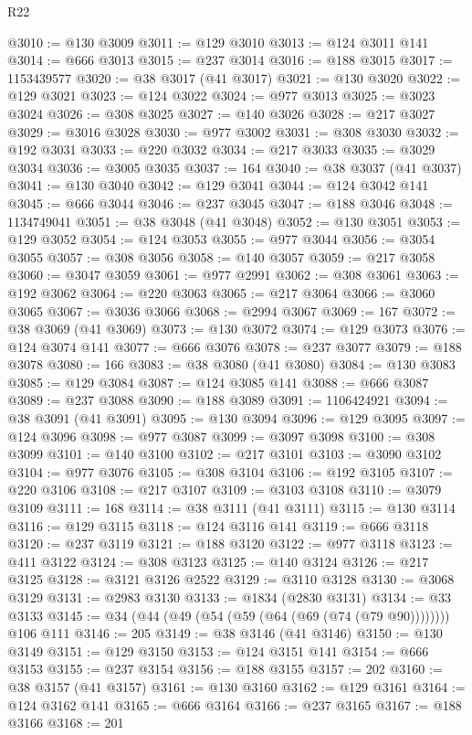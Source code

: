 \begin{lexlean}{R22}
\begin{coremodule}
@3010 := @130 @3009
@3011 := @129 @3010
@3013 := @124 @3011 @141
@3014 := @666 @3013
@3015 := @237 @3014
@3016 := @188 @3015
@3017 := 1153439577
@3020 := @38 @3017 (@41 @3017)
@3021 := @130 @3020
@3022 := @129 @3021
@3023 := @124 @3022
@3024 := @977 @3013
@3025 := @3023 @3024
@3026 := @308 @3025
@3027 := @140 @3026
@3028 := @217 @3027
@3029 := @3016 @3028
@3030 := @977 @3002
@3031 := @308 @3030
@3032 := @192 @3031
@3033 := @220 @3032
@3034 := @217 @3033
@3035 := @3029 @3034
@3036 := @3005 @3035
@3037 := 164
@3040 := @38 @3037 (@41 @3037)
@3041 := @130 @3040
@3042 := @129 @3041
@3044 := @124 @3042 @141
@3045 := @666 @3044
@3046 := @237 @3045
@3047 := @188 @3046
@3048 := 1134749041
@3051 := @38 @3048 (@41 @3048)
@3052 := @130 @3051
@3053 := @129 @3052
@3054 := @124 @3053
@3055 := @977 @3044
@3056 := @3054 @3055
@3057 := @308 @3056
@3058 := @140 @3057
@3059 := @217 @3058
@3060 := @3047 @3059
@3061 := @977 @2991
@3062 := @308 @3061
@3063 := @192 @3062
@3064 := @220 @3063
@3065 := @217 @3064
@3066 := @3060 @3065
@3067 := @3036 @3066
@3068 := @2994 @3067
@3069 := 167
@3072 := @38 @3069 (@41 @3069)
@3073 := @130 @3072
@3074 := @129 @3073
@3076 := @124 @3074 @141
@3077 := @666 @3076
@3078 := @237 @3077
@3079 := @188 @3078
@3080 := 166
@3083 := @38 @3080 (@41 @3080)
@3084 := @130 @3083
@3085 := @129 @3084
@3087 := @124 @3085 @141
@3088 := @666 @3087
@3089 := @237 @3088
@3090 := @188 @3089
@3091 := 1106424921
@3094 := @38 @3091 (@41 @3091)
@3095 := @130 @3094
@3096 := @129 @3095
@3097 := @124 @3096
@3098 := @977 @3087
@3099 := @3097 @3098
@3100 := @308 @3099
@3101 := @140 @3100
@3102 := @217 @3101
@3103 := @3090 @3102
@3104 := @977 @3076
@3105 := @308 @3104
@3106 := @192 @3105
@3107 := @220 @3106
@3108 := @217 @3107
@3109 := @3103 @3108
@3110 := @3079 @3109
@3111 := 168
@3114 := @38 @3111 (@41 @3111)
@3115 := @130 @3114
@3116 := @129 @3115
@3118 := @124 @3116 @141
@3119 := @666 @3118
@3120 := @237 @3119
@3121 := @188 @3120
@3122 := @977 @3118
@3123 := @411 @3122
@3124 := @308 @3123
@3125 := @140 @3124
@3126 := @217 @3125
@3128 := @3121 @3126 @2522
@3129 := @3110 @3128
@3130 := @3068 @3129
@3131 := @2983 @3130
@3133 := @1834 (@2830 @3131)
@3134 := @33 @3133
@3145 := @34 (@44 (@49 (@54 (@59 (@64 (@69 (@74 (@79 @90)))))))) @106 @111
@3146 := 205
@3149 := @38 @3146 (@41 @3146)
@3150 := @130 @3149
@3151 := @129 @3150
@3153 := @124 @3151 @141
@3154 := @666 @3153
@3155 := @237 @3154
@3156 := @188 @3155
@3157 := 202
@3160 := @38 @3157 (@41 @3157)
@3161 := @130 @3160
@3162 := @129 @3161
@3164 := @124 @3162 @141
@3165 := @666 @3164
@3166 := @237 @3165
@3167 := @188 @3166
@3168 := 201

\end{coremodule}
\end{lexlean}
